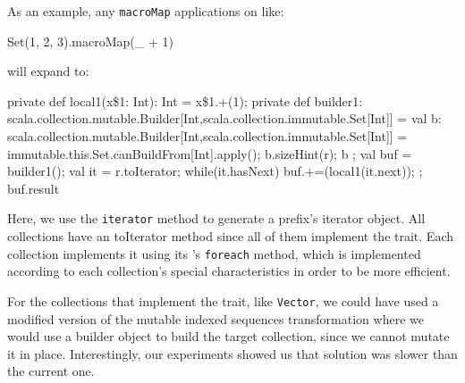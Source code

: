 As an
example, any \texttt{macroMap} applications on  like:

\begin{scalaCode}
Set(1, 2, 3).macroMap(\_ + 1)
\end{scalaCode}

will expand to:

\begin{scalaCode}
{
  private def local1(x\$1: Int): Int = x\$1.+(1);
  private def builder1:
scala.collection.mutable.Builder[Int,scala.collection.immutable.Set[Int]] = {
    val b:
scala.collection.mutable.Builder[Int,scala.collection.immutable.Set[Int]] =
immutable.this.Set.canBuildFrom[Int].apply();
    b.sizeHint(r);
    b
  };
  val buf = builder1();
  val it = r.toIterator;
  while(it.hasNext){
    buf.+=(local1(it.next));
  };
  buf.result
}
\end{scalaCode}


Here, we use the \texttt{iterator} method to generate a prefix's iterator object. All
collections have an toIterator method since all of them implement the
 trait. Each collection implements it using its
's \texttt{foreach} method, which is implemented according to
each collection's special characteristics in order to be more efficient.

For the collections that implement the  trait, like \texttt{Vector},
we could have used a modified version of the mutable indexed sequences
transformation where we would use a builder object to build the target
collection, since we cannot mutate it in place. Interestingly, our experiments
showed us that solution was slower than the current one.
